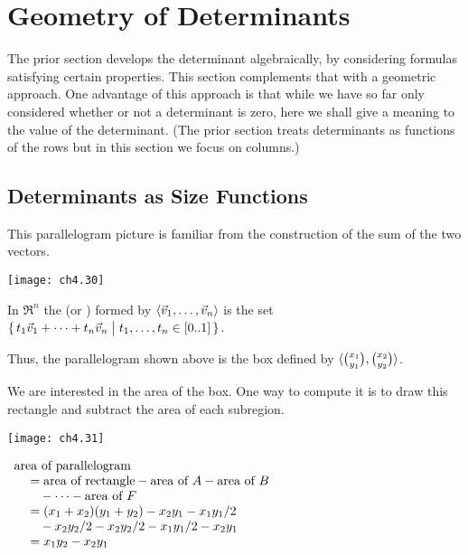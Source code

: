 \section{Geometry of Determinants}
The prior section develops the determinant algebraically, by
considering formulas satisfying certain properties.
This section complements that with a geometric approach.
One advantage of this approach is that while 
we have so far only considered whether or not a determinant is zero,
here we shall give a meaning to the value of the determinant.
(The prior section treats determinants as functions of the
rows but in this section we focus on columns.)










\subsection{Determinants as Size Functions}
This parallelogram picture
is familiar from the construction of the sum of the two vectors.
\begin{center}
  \texttt{[image: ch4.30]}
\end{center}

\begin{definition}
In $\Re^n$
the 
(or )
formed by 
\( \langle\vec{v}_1,\dots,\vec{v}_n\rangle \) 
is the set
\( \mbox{$\{\,t_1\vec{v}_1+\dots+t_n\vec{v}_n
      \bigm| t_1,\ldots,t_n\in [0..1]\,\}$} \).
\end{definition}

\noindent Thus, the parallelogram shown above is the box defined by 
$\langle\binom{x_1}{y_1},\binom{x_2}{y_2}\rangle$.

We are interested in the area of the box.
One way to compute it is to draw this rectangle
and subtract the area of each subregion.
\begin{center}
  \parbox{1.5in}{\hbox{}\hfil\texttt{[image: ch4.31]}\hfil\hbox{}}
  \quad
  \parbox{3.0in}{
    \hbox{}\hfil
    $\begin{array}{l}
       \text{area of parallelogram}                    \\
         \hbox{}\quad \hbox{}
            =\text{area of rectangle}
                -\text{area of $A$}-\text{area of $B$} \\
         \hbox{}\qquad \hbox{}
            -\cdots-\text{area of $F$}                   \\
         \hbox{}\quad \hbox{}
            =(x_1+x_2)(y_1+y_2)-x_2y_1-x_1y_1/2        \\
         \hbox{}\qquad \hbox{}
            -x_2y_2/2-x_2y_2/2-x_1y_1/2-x_2y_1         \\
         \hbox{}\quad \hbox{}
            =x_1y_2-x_2y_1        
    \end{array}$
    \hfil\hbox{}}
\end{center}


